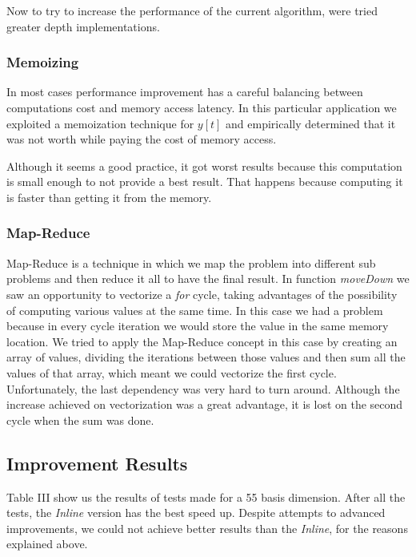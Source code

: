 \documentclass[conference]{IEEEtran}
\begin{document}
    Now to try to increase the performance of the current algorithm, were tried greater depth implementations.
    
\subsubsection{Memoizing}
In most cases performance improvement has a careful balancing between computations cost and memory access latency. In this particular application we exploited a memoization technique for $y[t]$ and empirically determined that it was not worth while paying the cost of memory access.

    Although it seems a good practice, it got worst results because this computation is small enough to not provide a best result. That happens because computing it is faster than getting it from the memory.
    
\subsubsection{Map-Reduce}
Map-Reduce is a technique in which we map the problem into different sub problems and then reduce it all to have the final result.
In function \emph{moveDown} we saw an opportunity to vectorize a \emph{for} cycle, taking advantages of the possibility of computing various values at the same time.
In this case we had a problem because in every cycle iteration we would store the value in the same memory location.
We tried to apply the Map-Reduce concept in this case by creating an array of values, dividing the iterations between those values and then sum all the values of that array, which meant we could vectorize the first cycle.
Unfortunately, the last dependency was very hard to turn around. Although the increase achieved on vectorization was a great advantage, it is lost on the second cycle when the sum was done.
    
\subsection{Improvement Results}
    Table III show us the results of tests made for a 55 basis dimension. After all the tests, the \emph{Inline} version has the best speed up. Despite attempts to advanced improvements, we could not achieve better results than the \emph{Inline}, for the reasons explained above.
    
\end{document}
